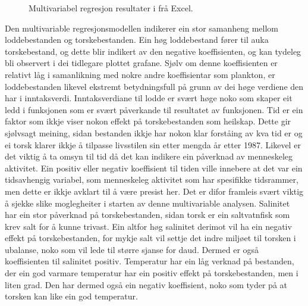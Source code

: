 \documentclass{report}
\begin{document}
\begin{figure}[H]
	\centering
	\caption{Multivariabel regresjon resultater i frå Excel.}
	\label{Multi}
\end{figure}
Den multivariable regresjonsmodellen indikerer ein stor samanheng mellom loddebestanden og torskebestanden. Ein høg loddebestand fører til auka torskebestand, og dette blir indikert av den negative koeffisienten, og kan tydeleg bli observert i dei tidlegare plottet grafane.
Sjølv om denne koeffisienten er relativt låg i samanlikning med nokre andre koeffisientar som plankton, er loddebestanden likevel ekstremt betydningsfull på grunn av dei høge verdiene den har i inntaksverdi. Inntaksverdiane til lodde er svært høge noko som skaper eit ledd i funksjonen som er svært påverkande til resultatet av funksjonen.
Tid er ein faktor som ikkje viser nokon effekt på torskebestanden som heilskap. Dette gir sjølvsagt meining, sidan bestanden ikkje har nokon klar forståing av kva tid er og ei torsk klarer ikkje å tilpasse livsstilen sin etter mengda år etter 1987.
Likevel er det viktig å ta omsyn til tid då det kan indikere ein påverknad av menneskeleg aktivitet. Ein positiv eller negativ koeffisient til tiden ville innebere at det var ein tidsavhengig variabel, som menneskeleg aktivitet som har spesifikke tidsrammer, men dette er ikkje avklart til å være presist her.
Det er difor framleis svært viktig å sjekke slike moglegheiter i starten av denne multivariable analysen.
Salinitet har ein stor påverknad på torskebestanden, sidan torsk er ein saltvatnfisk som krev salt for å kunne trivast.
Ein altfor høg salinitet derimot vil ha ein negativ effekt på torskebestanden, for mykje salt vil settje det indre miljøet til torsken i ubalanse, noko som vil lede til større sjanse for daud.
Dermed er også koeffisienten til salinitet positiv. Temperatur har ein låg verknad på bestanden, der ein god varmare temperatur har ein positiv effekt på torskebestanden, men i liten grad. Den har dermed også ein negativ koeffisient, noko som tyder på at torsken kan like ein god temperatur.
\end{document}
